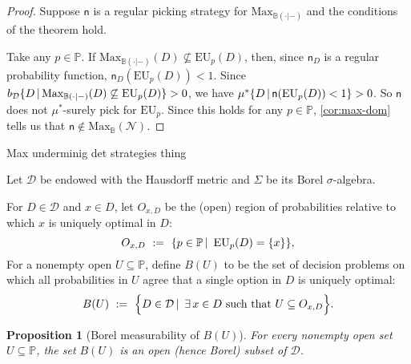 \documentclass[a4paper]{article}
\newtheorem{proposition}[theorem]{Proposition}
\renewcommand\P{\mathbb{P}} %
\newcommand\EU{\mathrm{EU}}
\newcommand\Maximality{\mathrm{Max}}
\newcommand{\D}{\mathcal{D}}
\newcommand{\Decs}{\mathcal{D}}
\newcommand{\n}{\mathsf{n}}
\renewcommand{\nu}{\n}
\newcommand\Nu{\mathcal{N}}
\newcommand{\IB}{\mathbb{B}}
\newcommand{\IP}{\P}
\renewcommand{\color}[1]{}
\newenvironment{colored}[1]{\leavevmode\color{#1}}{}
\newcommand\SetDelimiter[1][]{
	\nonscript\,#1\vert \allowbreak \nonscript\,\mathopen{}}
\providecommand\given{\SetDelimiter}
\newenvironment{CCM rewritten}
{\begingroup\color{blue}} %
{\endgroup}              %
\begin{document}
\begin{proof}
	Suppose $\nu$ is a regular picking strategy for $\Maximality_{\IB(\cdot|-)}$ and the conditions of the theorem hold. 
	
	Take any $p\in\IP$.
	If $\Maximality_{\IB(\cdot|-)}(D)\not\subseteq\EU_p(D)$, then, since $\n_D$ is a regular probability function, $\nu_D(\EU_p(D))< 1$. 
	Since 
	$b_\D\{D\given \Maximality_{\IB(\cdot|-)}(D)\not\subseteq\EU_p(D)\}>0$, we have $\mu^*\{D\given \nu(\EU_p(D))<1\}>0$.
	 So $\nu$ does not $\mu^*$-surely pick for $\EU_p$. Since this holds for any $p \in \IP$, \cref{cor:max-dom} tells us that $\nu\notin\Maximality_\IB(\Nu)$. 
\end{proof}


\begin{colored}
	{blue}
	
	Max underminig det strategies thing
\end{colored}



\newpage

Let $\Decs$ be endowed with the Hausdorff metric and $\Sigma$ be its Borel $\sigma$-algebra. 

For $D\in\Decs$ and $x\in D$, let $O_{x,D}$ be the (open) region of probabilities relative to which $x$ is uniquely optimal in $D$:
\[
O_{x,D}\ :=\ \{p\in \IP\given\ \EU_p(D)=\{x\}\},
\]
For a nonempty open $U\subseteq \IP$, define $B(U)$ to be the set of decision problems on which all probabilities in $U$ agree that a single option in $D$ is uniquely optimal:
\[
B(U)\ :=\ \Big\{D\in\Decs\given\ \exists\, x\in D\ \text{such that } U\subseteq O_{x,D}\Big\}.
\]



\begin{proposition}[Borel measurability of $B(U)$]\label{prop:BU-borel}
For every nonempty open set $U\subseteq \IP$, the set $B(U)$ is an open (hence Borel) subset of $\Decs$.
\end{proposition}
\end{document}
